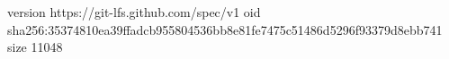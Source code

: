 version https://git-lfs.github.com/spec/v1
oid sha256:35374810ea39ffadcb955804536bb8e81fe7475c51486d5296f93379d8ebb741
size 11048
